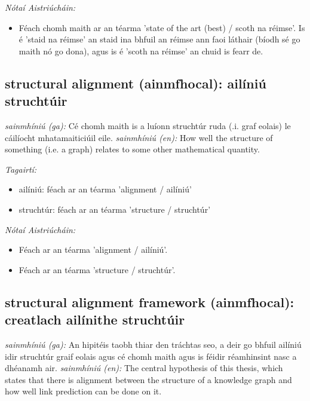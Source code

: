 \documentclass{article}
\begin{document}
 \noindent \textit{Nótaí Aistriúcháin:}
\begin{itemize}
	\item Féach chomh maith ar an téarma 'state of the art (best) / scoth na réimse'. Is é 'staid na réimse' an staid ina bhfuil an réimse ann faoi láthair (bíodh sé go maith nó go dona), agus is é 'scoth na réimse' an chuid is fearr de.
\end{itemize}


\subsection*{structural alignment (ainmfhocal): ailíniú struchtúir} 
 \noindent \textit{sainmhíniú (ga):} Cé chomh maith is a luíonn struchtúr ruda (.i. graf eolais) le cáilíocht mhatamaiticiúil eile.
\newline\newline
 \noindent \textit{sainmhíniú (en):} How well the structure of something (i.e. a graph) relates to some other mathematical quantity.
\newline

 \noindent \textit{Tagairtí:}
\begin{itemize}
	\item ailíniú: féach ar an téarma 'alignment / ailíniú'
	\item struchtúr: féach ar an téarma 'structure / struchtúr'
\end{itemize}

 \noindent \textit{Nótaí Aistriúcháin:}
\begin{itemize}
	\item Féach ar an téarma 'alignment / ailíniú'.
	\item Féach ar an téarma 'structure / struchtúr'.
\end{itemize}


\subsection*{structural alignment framework (ainmfhocal): creatlach ailínithe struchtúir} 
 \noindent \textit{sainmhíniú (ga):} An hipitéis taobh thiar den tráchtas seo, a deir go bhfuil ailíniú idir struchtúr graif eolais agus cé chomh maith agus is féidir réamhinsint nasc a dhéanamh air.
\newline\newline
 \noindent \textit{sainmhíniú (en):} The central hypothesis of this thesis, which states that there is alignment between the structure of a knowledge graph and how well link prediction can be done on it.
\newline
\end{document}
